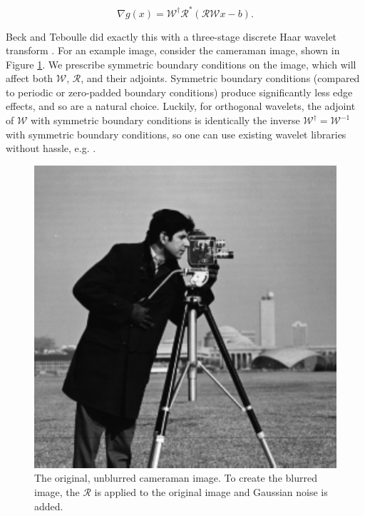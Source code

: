 \documentclass[journal]{IEEEtran}
\begin{document}
\[ \nabla g(x) = \mathcal{W}^\dagger \mathcal{R}^\ast \left(\mathcal{RW}x-b\right). \] 

\noindent Beck and Teboulle did exactly this with a three-stage discrete Haar wavelet transform \cite{beck_2009}.  For an example image, consider the cameraman image, shown in Figure \ref{fig:cameraman_original}.  We prescribe symmetric boundary conditions on the image, which will affect both $\mathcal{W}$, $\mathcal{R}$, and their adjoints.  Symmetric boundary conditions (compared to periodic or zero-padded boundary conditions) produce significantly less edge effects, and so are a natural choice.  Luckily, for orthogonal wavelets, the adjoint of $\mathcal{W}$ with symmetric boundary conditions is identically the inverse $\mathcal{W}^\dagger=\mathcal{W}^{-1}$ with symmetric boundary conditions, so one can use existing wavelet libraries without hassle, e.g. \cite{matlab_wt_2015}.\\

\begin{figure}
   \centering
   \includegraphics[width=0.8\columnwidth]{figures/cameraman.pdf}
   \caption{The original, unblurred cameraman image.  To create the blurred image, the $\mathcal{R}$ is applied to the original image and Gaussian noise is added.}
   \label{fig:cameraman_original}
\end{figure}
\end{document}
